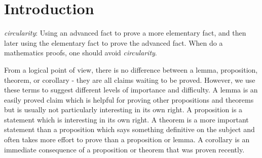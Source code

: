 \chapter{Introduction}\label{i:ch:1}

\begin{note}
  \emph{circularity}:
  Using an advanced fact to prove a more elementary fact, and then later using the elementary fact to prove the advanced fact.
  When do a mathematics proofs, one should avoid \emph{circularity}.
\end{note}

\begin{note}
  From a logical point of view, there is no difference between a lemma, proposition, theorem, or corollary
  - they are all claims waiting to be proved.
  However, we use these terms to suggest different levels of importance and difficulty.
  A lemma is an easily proved claim which is helpful for proving other propositions and theorems but is usually not particularly interesting in its own right.
  A proposition is a statement which is interesting in its own right.
  A theorem is a more important statement than a proposition which says something definitive on the subject and often takes more effort to prove than a proposition or lemma.
  A corollary is an immediate consequence of a proposition or theorem that was proven recently.
\end{note}
